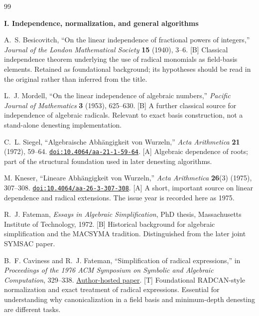 \documentclass[11pt,a4paper]{article}
\numberwithin{equation}{section}
\theoremstyle{definition}\newtheorem{definition}[theorem]{Definition}
\theoremstyle{remark}\newtheorem{remark}[theorem]{Remark}
\newcommand{\doi}[1]{\href{https://doi.org/#1}{\nolinkurl{doi:#1}}}
\newcommand{\access}[2]{\href{#1}{#2}}
\newcommand{\status}[1]{\textsf{\footnotesize[#1]}}
\newcommand{\bibgroup}[1]{\par\Needspace{7\baselineskip}\bigskip\item[]\textbf{#1}\par\smallskip}
\begin{document}
\clearpage
{}
{}
\renewcommand{\refname}{Annotated bibliography and source directory}
\begin{thebibliography}{99}
\setlength{\itemsep}{3pt}
\small
\bibgroup{I. Independence, normalization, and general algorithms}

 A.~S. Besicovitch, ``On the linear independence of fractional powers of integers,'' \emph{Journal of the London Mathematical Society} \textbf{15} (1940), 3--6. \status{B}
Classical independence theorem underlying the use of radical monomials as field-basis elements. Retained as foundational background; its hypotheses should be read in the original rather than inferred from the title.

 L.~J. Mordell, ``On the linear independence of algebraic numbers,'' \emph{Pacific Journal of Mathematics} \textbf{3} (1953), 625--630. \status{B}
A further classical source for independence of algebraic radicals. Relevant to exact basis construction, not a stand-alone denesting implementation.

 C.~L. Siegel, ``Algebraische Abh\"angigkeit von Wurzeln,'' \emph{Acta Arithmetica} \textbf{21} (1972), 59--64. \doi{10.4064/aa-21-1-59-64}. \status{A}
Algebraic dependence of roots; part of the structural foundation used in later denesting algorithms.

 M. Kneser, ``Lineare Abh\"angigkeit von Wurzeln,'' \emph{Acta Arithmetica} \textbf{26}(3) (1975), 307--308. \doi{10.4064/aa-26-3-307-308}. \status{A}
A short, important source on linear dependence and radical extensions. The issue year is recorded here as 1975.

 R.~J. Fateman, \emph{Essays in Algebraic Simplification}, PhD thesis, Massachusetts Institute of Technology, 1972. \status{B}
Historical background for algebraic simplification and the MACSYMA tradition. Distinguished from the later joint SYMSAC paper.

 B.~F. Caviness and R.~J. Fateman, ``Simplification of radical expressions,'' in \emph{Proceedings of the 1976 ACM Symposium on Symbolic and Algebraic Computation}, 329--338.
\access{https://people.eecs.berkeley.edu/~fateman/papers/radcan.pdf}{Author-hosted paper}. \status{T}
Foundational RADCAN-style normalization and exact treatment of radical expressions. Essential for understanding why canonicalization in a field basis and minimum-depth denesting are different tasks.


\end{thebibliography}
\end{document}
